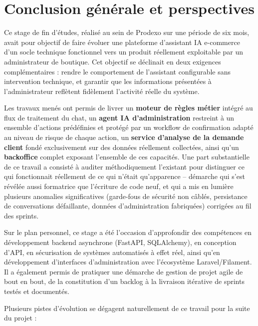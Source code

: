 \chapter*{Conclusion générale et perspectives}

Ce stage de fin d'études, réalisé au sein de Prodexo sur une période de six mois, avait pour objectif de faire évoluer une plateforme d'assistant IA e-commerce d'un socle technique fonctionnel vers un produit réellement exploitable par un administrateur de boutique. Cet objectif se déclinait en deux exigences complémentaires : rendre le comportement de l'assistant configurable sans intervention technique, et garantir que les informations présentées à l'administrateur reflètent fidèlement l'activité réelle du système.

Les travaux menés ont permis de livrer un \textbf{moteur de règles métier} intégré au flux de traitement du chat, un \textbf{agent IA d'administration} restreint à un ensemble d'actions prédéfinies et protégé par un workflow de confirmation adapté au niveau de risque de chaque action, un \textbf{service d'analyse de la demande client} fondé exclusivement sur des données réellement collectées, ainsi qu'un \textbf{backoffice} complet exposant l'ensemble de ces capacités. Une part substantielle de ce travail a consisté à auditer méthodiquement l'existant pour distinguer ce qui fonctionnait réellement de ce qui n'était qu'apparence -- démarche qui s'est révélée aussi formatrice que l'écriture de code neuf, et qui a mis en lumière plusieurs anomalies significatives (garde-fous de sécurité non câblés, persistance de conversations défaillante, données d'administration fabriquées) corrigées au fil des sprints.

Sur le plan personnel, ce stage a été l'occasion d'approfondir des compétences en développement backend asynchrone (FastAPI, SQLAlchemy), en conception d'API, en sécurisation de systèmes automatisés à effet réel, ainsi qu'en développement d'interfaces d'administration avec l'écosystème Laravel/Filament. Il a également permis de pratiquer une démarche de gestion de projet agile de bout en bout, de la constitution d'un backlog à la livraison itérative de sprints testés et documentés.

Plusieurs pistes d'évolution se dégagent naturellement de ce travail pour la suite du projet :

